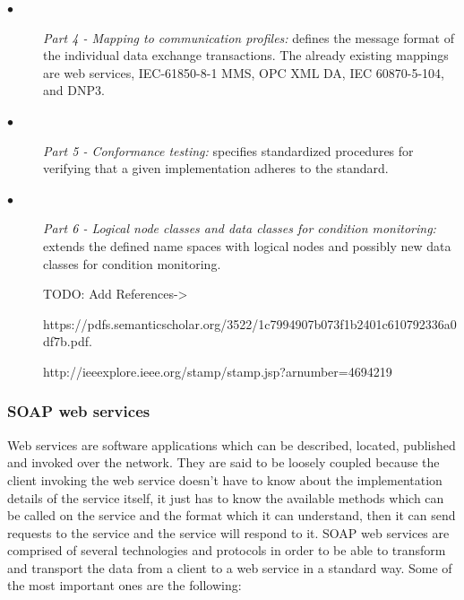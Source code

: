 \documentclass[twosided,a4,10pt]{article}
\begin{document}
\begin{multicols}{2}
\begin{description}
  		\item[$\bullet$] 
  			 \textit{Part 4 - Mapping to communication profiles:} defines the message format of the individual data exchange transactions. The already existing mappings are web services, IEC-61850-8-1 MMS, OPC XML DA, IEC 60870-5-104, and DNP3. 	
  		\item[$\bullet$]	
  		 	 \textit{Part 5 - Conformance testing:} specifies standardized procedures for verifying that a given implementation adheres to the standard.
  		\item[$\bullet$]	
  			\textit{Part 6 - Logical node classes and data classes for condition monitoring:} extends the defined name spaces with logical nodes and possibly new data classes for condition monitoring.
  			
  			TODO: Add References->
  		
  			https://pdfs.semanticscholar.org/3522/1c7994907b073f1b2401c610792336a0df7b.pdf.
  		
  			http://ieeexplore.ieee.org/stamp/stamp.jsp?arnumber=4694219
  		
  	\end{description}
  \subsubsection{SOAP web services}  	
   Web services are software applications which can be described, located, published and invoked over the network. They are said to be loosely coupled because the client invoking the web service doesn't have to know about the implementation details of the service itself, it just has to know the available methods which can be called on the service and the format which it can understand, then it can send requests to the service and the service will respond to it. SOAP web services are comprised of several technologies and protocols in order to be able to transform and transport the data from a client to a web service in a standard way. Some of the most important ones are the following:
   

\end{multicols}
\end{document}
